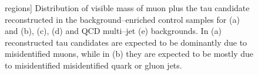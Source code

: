 \begin{figure}
\begin{center}
regions]{\captiontext 
	 Distribution of visible mass of muon plus the tau candidate reconstructed
         in the background--enriched control samples for 
         \ZMM (a) and (b), \WpJets (c), \ttbarpJets (d) and QCD multi--jet (e) backgrounds.
         In (a) reconstructed tau candidates are expected to be dominantly due to misidentified muons,
         while in (b) they are expected to be mostly due to misidentified misidentified quark or gluon jets.}
\label{fig:VisMassMuTauBgControlRegions}
\end{center}
\end{figure} 
%
\begin{figure}
\setlength{\unitlength}{1mm}
\begin{center}
\end{center}
\end{figure}
